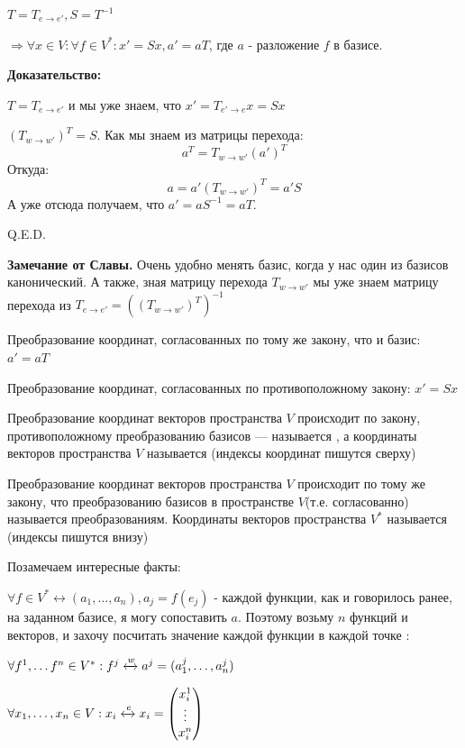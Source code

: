 $T = T_{e\rightarrow e'}, S = T^{-1}$

$ \Rightarrow \forall x \in V: \forall f \in V^*:x' = Sx, a' = aT$, где $a$ - разложение $f$ в базисе.

\textbf{Доказательство:}

$T=T_{e\rightarrow e'}$ и мы уже знаем, что $x' = T_{e'\rightarrow e}x = Sx$ 

$(T_{w\rightarrow w'})^T = S$. Как мы знаем из матрицы перехода:
$$a^T = T_{w\rightarrow w'}(a')^T$$ 
Откуда:
$$a = a'(T_{w\rightarrow w'})^T = a'S$$
А уже отсюда получаем, что $a' = aS^{-1} = aT$.

\hfill Q.E.D.

\textbf{Замечание от Славы.} Очень удобно менять базис, когда у нас один из базисов канонический. А также, зная матрицу перехода $T_{w\rightarrow w'}$ мы уже знаем матрицу перехода из $T_{e\rightarrow e'} =((T_{w\rightarrow w'})^T)^{-1} $


Преобразование координат, согласованных по тому же закону, что и базис:
$a' =a T$

Преобразование координат, согласованных по противоположному закону:
$x' = Sx$

 Преобразование координат векторов пространства $V$ происходит по закону, противоположному преобразованию базисов --- называется , а координаты векторов пространства $V$ называется (индексы координат пишутся сверху)

 Преобразование координат векторов пространства $V$ происходит по тому же закону, что преобразованию базисов в пространстве $V$(т.е. согласованно) называется  преобразованиям.
Координаты векторов пространства $V^* $ называется (индексы пишутся внизу)

Позамечаем интересные факты:

$\forall f \in V^* \leftrightarrow (a_1,\ldots, a_n), a_j = f(e_j)$ - каждой функции, как и говорилось ранее, на заданном базисе, я могу сопоставить $a$. Поэтому возьму $n$ функций и векторов, и захочу посчитать значение каждой функции в каждой точке : 

$\forall f^1, \ldots f^n \in V^*: f^j \xleftrightarrow{w} a^j = (a_1^j,\ldots , a_n^j)$

$\forall x_1, \ldots, x_n \in V: x_i \xleftrightarrow{e}x_i = \begin{pmatrix}
    x^1_i \\
    \vdots \\ 
    x^n_i
\end{pmatrix}$

